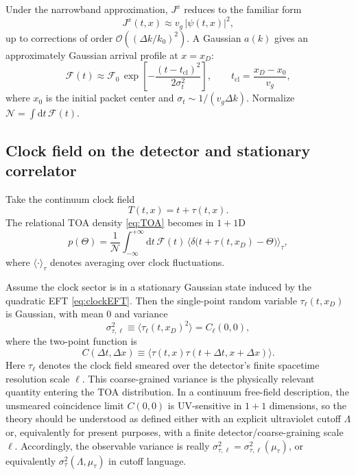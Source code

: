 \documentclass[pdflatex,sn-mathphys-num]{sn-jnl}
\theoremstyle{thmstylethree}
\theoremstyle{thmstyleone}
\theoremstyle{thmstyletwo}
\numberwithin{equation}{section}
\newcommand{\dd}{\mathrm{d}}
\newcommand{\F}{\mathcal{F}}
\newcommand{\cO}{\mathcal{O}}
\begin{document}
        Under the narrowband approximation, $J^x$ reduces to the familiar form
        \begin{equation}
            J^x(t,x)\approx v_g\,|\psi(t,x)|^2,
            \label{eq:Japprox}
        \end{equation}
        up to corrections of order $\cO((\Delta k/k_0)^2)$. A Gaussian $a(k)$ gives an approximately Gaussian arrival profile at $x=x_D$:
        \begin{equation}
            \F(t)\approx \F_0\,\exp\!\left[-\frac{(t-t_{\mathrm{cl}})^2}{2\sigma_t^2}\right],
            \qquad
            t_{\mathrm{cl}}=\frac{x_D-x_0}{v_g},
            \label{eq:fluxGaussian}
        \end{equation}
        where $x_0$ is the initial packet center and $\sigma_t\sim 1/(v_g\Delta k)$. Normalize $\mathcal{N}=\int \dd t\,\F(t)$.
    
    \subsection{Clock field on the detector and stationary correlator}
        
        Take the continuum clock field
        \begin{equation}
            T(t,x)=t+\tau(t,x).
        \end{equation}
        The relational TOA density \eqref{eq:TOA} becomes in $1+1$D
        \begin{equation}
            p(\Theta)=\frac{1}{\mathcal{N}}\int_{-\infty}^{+\infty}\dd t\,
            \F(t)\,
            \Big\langle \delta\!\big(t+\tau(t,x_D)-\Theta\big)\Big\rangle_{\tau},
            \label{eq:pThetaAvg}
        \end{equation}
        where $\langle\cdot\rangle_\tau$ denotes averaging over clock fluctuations.
        
        Assume the clock sector is in a stationary Gaussian state induced by the quadratic EFT \eqref{eq:clockEFT}. Then the single-point random variable $\tau_\ell(t,x_D)$ is Gaussian, with mean $0$ and variance
        \begin{equation}
            \sigma_{\tau,\ell}^2 \equiv \langle \tau_\ell(t,x_D)^2\rangle = C_\ell(0,0),
        \end{equation}
        where the two-point function is
        \begin{equation}
            C(\Delta t,\Delta x)\equiv \langle \tau(t,x)\tau(t+\Delta t,x+\Delta x)\rangle .
        \end{equation}
        Here $\tau_\ell$ denotes the clock field smeared over the detector's finite spacetime resolution scale $\ell$. This coarse-grained variance is the physically relevant quantity entering the TOA distribution. In a continuum free-field description, the unsmeared coincidence limit $C(0,0)$ is UV-sensitive in $1+1$ dimensions, so the theory should be understood as defined either with an explicit ultraviolet cutoff $\Lambda$ or, equivalently for present purposes, with a finite detector/coarse-graining scale $\ell$. Accordingly, the observable variance is really $\sigma_{\tau,\ell}^2=\sigma_{\tau,\ell}^2(\mu_\tau)$, or equivalently $\sigma_\tau^2(\Lambda,\mu_\tau)$ in cutoff language.
        
\end{document}
